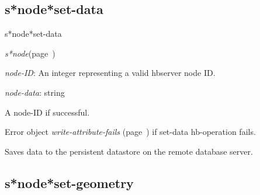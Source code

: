\subsection{s*node*set-data}
\label{s*node*set-data}

\begin{description}
\item [Name:]  s*node*set-data

\item [Class:] {\sl s*node}\hfill(page~\pageref{s*node})

\item [Parameters:]
\item {\sl node-ID}:   An integer representing
a valid hbserver node ID.

\item {\sl node-data}:  string


\item [Return-value:]
A node-ID if successful.

Error object {\sl write-attribute-fails} (page~\pageref{write-attribute-fails}) if set-data
hb-operation fails.

\item [Description:]
Saves data to the persistent datastore on the remote
database server.


\item [Public:]



\end{description}
\horizontalline

\subsection{s*node*set-geometry}
\label{s*node*set-geometry}

